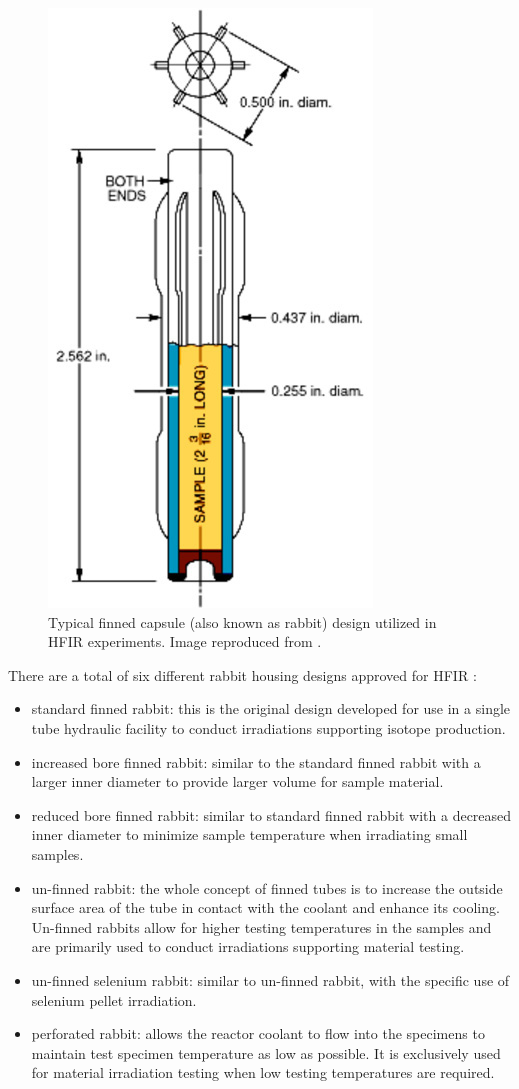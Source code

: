 \begin{figure}[htbp!] %
    \centering
    \includegraphics[width=0.30\linewidth]{figures/finned-rabbit}
    \hfill
    \caption{Typical finned capsule (also known as rabbit) design utilized in HFIR experiments. Image reproduced from \cite{hfir}.}
    \label{fig:hfir-rabbit}
\end{figure}

There are a total of six different rabbit housing designs approved for HFIR \cite{hfir}:
\begin{itemize}
  \item standard finned rabbit: this is the original design developed for use in a single tube hydraulic facility to conduct irradiations supporting isotope production.
  \item increased bore finned rabbit: similar to the standard finned rabbit with a larger inner diameter to provide larger volume for sample material.
  \item reduced bore finned rabbit: similar to standard finned rabbit with a decreased inner diameter to minimize sample temperature when irradiating small samples.
  \item un-finned rabbit: the whole concept of finned tubes is to increase the outside surface area of the tube in contact with the coolant and enhance its cooling. Un-finned rabbits allow for higher testing temperatures in the samples and are primarily used to conduct irradiations supporting material testing.
  \item un-finned selenium rabbit: similar to un-finned rabbit, with the specific use of selenium pellet irradiation.
  \item perforated rabbit: allows the reactor coolant to flow into the specimens to maintain test specimen temperature as low as possible. It is exclusively used for material irradiation testing when low testing temperatures are required.
\end{itemize}

